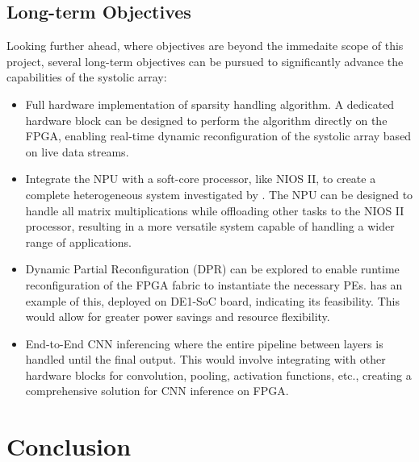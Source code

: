 \documentclass[12pt, a4paper, ukenglish]{article}
\begin{document}
    \subsection{Long-term Objectives} \label{sec: long-term}
    Looking further ahead, where objectives are beyond the immedaite scope of this project, several long-term objectives can be pursued to significantly advance the capabilities of the systolic array:
    \begin{itemize}
        \item Full hardware implementation of sparsity handling algorithm. A dedicated hardware block can be designed to perform the algorithm directly on the FPGA, enabling real-time dynamic reconfiguration of the systolic array based on live data streams.
        \item Integrate the NPU with a soft-core processor, like NIOS II, to create a complete heterogeneous system investigated by \textcite{liu_energy-efficient_2024}. The NPU can be designed to handle all matrix multiplications while offloading other tasks to the NIOS II processor, resulting in a more versatile system capable of handling a wider range of applications. %
        \item Dynamic Partial Reconfiguration (DPR) can be explored to enable runtime reconfiguration of the FPGA fabric to instantiate the necessary PEs. \textcite{beasley_developing_nodate} has an example of this, deployed on DE1-SoC board, indicating its feasibility. This would allow for greater power savings and resource flexibility.
        \item End-to-End CNN inferencing where the entire pipeline between layers is handled until the final output. This would involve integrating with other hardware blocks for convolution, pooling, activation functions, etc., creating a comprehensive solution for CNN inference on FPGA.
    \end{itemize}




    
\section{Conclusion} \label{sec: conclusion}



\newpage
{}
\printbibliography
\end{document}
